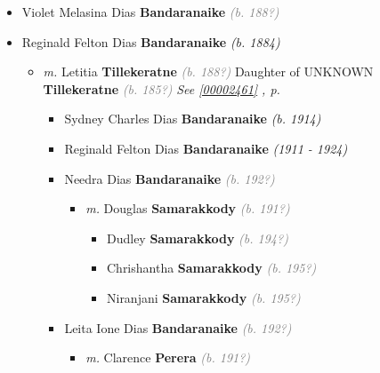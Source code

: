 \documentclass[10pt, openany]{book}
\begin{document}
\begin{itemize}
{\begin{itemize}
{\begin{itemize}
{\begin{itemize}
\end{itemize}
   }
\item{Violet Melasina Dias \textbf{Bandaranaike} \textcolor{gray}{\textit{(b. 188?)}}
   }
\item{Reginald Felton Dias \textbf{Bandaranaike} \textcolor{slorange}{\textit{(b. 1884)}}
\begin{itemize}
\item{\textit{m.} Letitia \textbf{Tillekeratne} \textcolor{gray}{\textit{(b. 188?)}} Daughter of  UNKNOWN \textbf{Tillekeratne} \textcolor{gray}{\textit{(b. 185?)}} \textcolor{slteal}{\textit{See  \autoref{00002461} \textit{, p. \pageref{00002461} }}}   \label{couple:00002459:00002460} \begin{itemize}
\item{Sydney Charles Dias \textbf{Bandaranaike} \textcolor{slorange}{\textit{(b. 1914)}}
   }
\item{Reginald Felton Dias \textbf{Bandaranaike} \textcolor{slorange}{\textit{(1911 - 1924)}}
   }
\item{Needra Dias \textbf{Bandaranaike} \textcolor{gray}{\textit{(b. 192?)}}
\begin{itemize}
\item{\textit{m.} Douglas \textbf{Samarakkody} \textcolor{gray}{\textit{(b. 191?)}}   \label{couple:00002470:00002471} \begin{itemize}
\item{Dudley \textbf{Samarakkody} \textcolor{gray}{\textit{(b. 194?)}}
 }
\item{Chrishantha \textbf{Samarakkody} \textcolor{gray}{\textit{(b. 195?)}}
 }
\item{Niranjani \textbf{Samarakkody} \textcolor{gray}{\textit{(b. 195?)}}
 }
\end{itemize}}
\end{itemize}
  }
\item{Leita Ione Dias \textbf{Bandaranaike} \textcolor{gray}{\textit{(b. 192?)}}
\begin{itemize}
\item{\textit{m.} Clarence \textbf{Perera} \textcolor{gray}{\textit{(b. 191?)}}   \label{couple:00002465:00002466} \begin{itemize}

\end{itemize}}
\end{itemize}}
\end{itemize}}
\end{itemize}}
\end{itemize}}
\end{itemize}}
\end{itemize}
\end{document}
